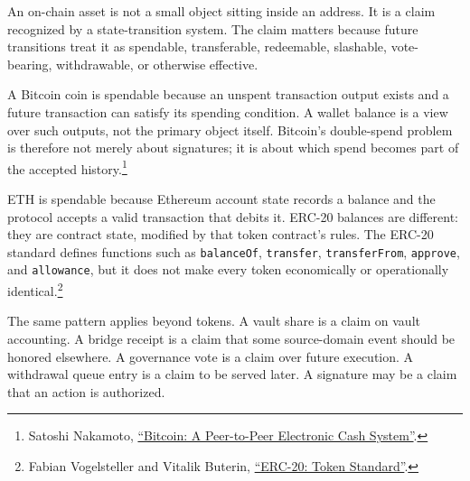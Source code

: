 An on-chain asset is not a small object sitting inside an address. It is a claim recognized by a state-transition system. The claim matters because future transitions treat it as spendable, transferable, redeemable, slashable, vote-bearing, withdrawable, or otherwise effective.

A Bitcoin coin is spendable because an unspent transaction output exists and a future transaction can satisfy its spending condition. A wallet balance is a view over such outputs, not the primary object itself. Bitcoin's double-spend problem is therefore not merely about signatures; it is about which spend becomes part of the accepted history.\footnote{Satoshi Nakamoto, \href{https://bitcoin.org/bitcoin.pdf}{``Bitcoin: A Peer-to-Peer Electronic Cash System''}.}

ETH is spendable because Ethereum account state records a balance and the protocol accepts a valid transaction that debits it. ERC-20 balances are different: they are contract state, modified by that token contract's rules. The ERC-20 standard defines functions such as \texttt{balanceOf}, \texttt{transfer}, \texttt{transferFrom}, \texttt{approve}, and \texttt{allowance}, but it does not make every token economically or operationally identical.\footnote{Fabian Vogelsteller and Vitalik Buterin, \href{https://eips.ethereum.org/EIPS/eip-20}{``ERC-20: Token Standard''}.}

The same pattern applies beyond tokens. A vault share is a claim on vault accounting. A bridge receipt is a claim that some source-domain event should be honored elsewhere. A governance vote is a claim over future execution. A withdrawal queue entry is a claim to be served later. A signature may be a claim that an action is authorized.


